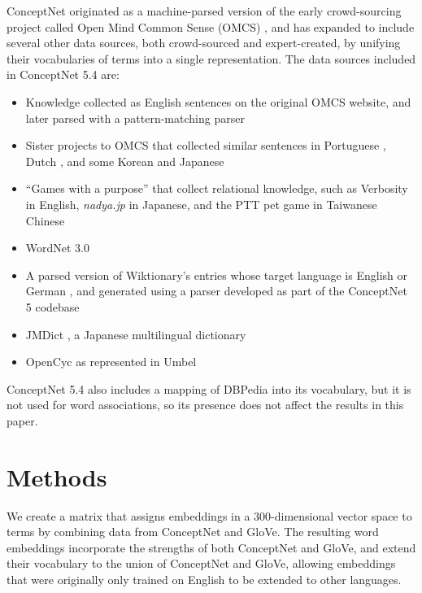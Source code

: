 \documentclass[letterpaper]{article}
\begin{document}
ConceptNet originated as a machine-parsed version of the early crowd-sourcing
project called Open Mind Common Sense (OMCS) \cite{singh2002omcs}, and has expanded
to include several other data sources, both crowd-sourced and expert-created,
by unifying their vocabularies of terms into a single representation.
The data sources included in ConceptNet 5.4 are:

\begin{itemize}
\item Knowledge collected as English sentences on the original OMCS website,
    and later parsed with a pattern-matching parser
\item Sister projects to OMCS that collected similar sentences in Portuguese
    \cite{anacleto2006portuguese},
    Dutch \cite{eckhardt2008kid}, and some Korean and Japanese
    \cite{chung2006globalmind}
\item ``Games with a purpose'' that collect relational knowledge, such as
    Verbosity \cite{vonahn2006verbosity} in English, {\em nadya.jp}
    \cite{nakahara2011nadya} in Japanese, and the PTT pet game \cite{kuo2009petgame}
    in Taiwanese Chinese
\item WordNet 3.0 \cite{miller1998wordnet}
\item A parsed version of Wiktionary's entries whose target language is English or
      German \cite{wiktionary2014en} \cite{wiktionary2014de}, and generated
      using a parser developed as part of the ConceptNet 5 codebase
\item JMDict \cite{breen2004jmdict}, a Japanese multilingual dictionary
\item OpenCyc \cite{matuszek2006cyc} as represented in Umbel \cite{bergman2008umbel}
\end{itemize}

ConceptNet 5.4 also includes a mapping of DBPedia \cite{auer2007dbpedia} into
its vocabulary, but it is not used for word associations, so its presence does
not affect the results in this paper.

\section{Methods}

We create a matrix that assigns embeddings in a 300-dimensional vector
space to terms by combining data from ConceptNet and GloVe. The resulting word
embeddings incorporate the strengths of both ConceptNet and GloVe, and extend
their vocabulary to the union of ConceptNet and GloVe, allowing embeddings that
were originally only trained on English to be extended to other languages.
\end{document}

